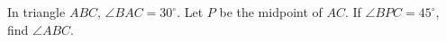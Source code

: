 In triangle $ABC$, $\angle BAC=30^\circ$. Let $P$ be the midpoint of $AC$. If $\angle BPC=45^\circ$, find $\angle ABC$.
